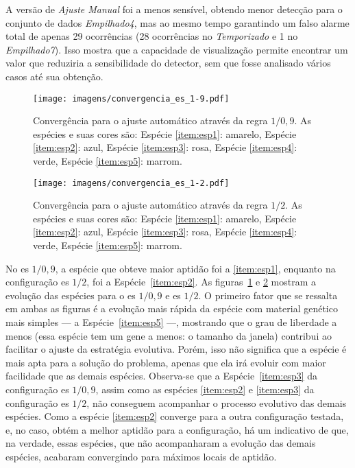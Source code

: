 A versão de \emph{Ajuste Manual} foi a menos sensível, obtendo menor
detecção para o conjunto de dados \emph{Empilhado4}, mas ao mesmo
tempo garantindo um falso alarme total de apenas 29 ocorrências (28
ocorrências no \emph{Temporizado} e 1 no \emph{Empilhado7}).
Isso mostra que a capacidade de visualização permite encontrar um
valor que reduziria a sensibilidade do detector, sem que fosse
analisado vários casos até sua obtenção.

\begin{figure}[!htb]
\centering
\texttt{[image: imagens/convergencia\_es\_1-9.pdf]}
\caption[Convergência para o ajuste automático através da regra
$1/0,9$.] {Convergência para o ajuste automático através da regra
$1/0,9$. As espécies e suas cores são: Espécie \ref{item:esp1}:
amarelo, Espécie \ref{item:esp2}: azul, Espécie \ref{item:esp3}: rosa,
Espécie \ref{item:esp4}: verde, Espécie \ref{item:esp5}: marrom.}
\label{fig:convergencia_es_1}
\end{figure}

\begin{figure}[!htb]
\centering
\texttt{[image: imagens/convergencia\_es\_1-2.pdf]}
\caption[Convergência para o ajuste automático através da regra
$1/2$.] {Convergência para o ajuste automático através da regra
$1/2$. As espécies e suas cores são: Espécie \ref{item:esp1}:
amarelo, Espécie \ref{item:esp2}: azul, Espécie \ref{item:esp3}: rosa,
Espécie \ref{item:esp4}: verde, Espécie \ref{item:esp5}: marrom.}
\label{fig:convergencia_es_2}
\end{figure}

No \acs{es} $1/0,9$, a espécie que obteve maior aptidão foi a
\ref{item:esp1}, enquanto na configuração \acs{es} $1/2$, foi a
Espécie~\ref{item:esp2}. As figuras~\ref{fig:convergencia_es_1} e
\ref{fig:convergencia_es_2} mostram a evolução das espécies para o
\acs{es} $1/0,9$ e \acs{es} $1/2$. O primeiro fator que se ressalta em
ambas as figuras é a evolução mais rápida da espécie com material
genético mais simples --- a Espécie~\ref{item:esp5}  ---, mostrando
que o grau de liberdade a menos (essa espécie tem um gene a menos: o
tamanho da janela) contribui ao facilitar o ajuste da estratégia
evolutiva. Porém, isso não significa que a espécie é mais apta para a
solução do problema, apenas que ela irá evoluir com maior facilidade
que as demais espécies. Observa-se que a Espécie~\ref{item:esp3} da
configuração \acs{es} $1/0,9$, assim como as espécies \ref{item:esp2}
e \ref{item:esp3} da configuração \acs{es} $1/2$, não conseguem
acompanhar o processo evolutivo das demais espécies. Como a espécie
\ref{item:esp2} converge para a outra configuração testada, e, no
caso, obtém a melhor aptidão para a configuração, há um indicativo de
que, na verdade, essas espécies, que não acompanharam a evolução das
demais espécies, acabaram convergindo para máximos locais de aptidão.

